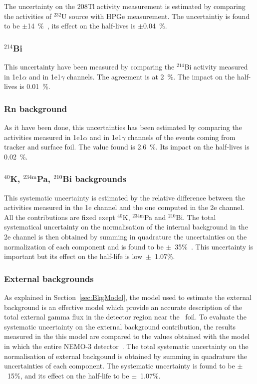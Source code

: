 \documentclass[main.tex]{subfiles}
\begin{document}
\NI The uncertainty on the $\text{208}$Tl activity measurement is estimated by comparing the activities of $^{\text{232}}$U source with HPGe measurement. The uncertaintiy is found to be $\pm$14~\%~\cite{PositionPaperSummer}, its effect on the half-lives is $\pm$0.04~\%. 
 
 
\subsubsection{$^{\text{214}}$Bi}


\NI This uncertainty have been measured by comparing the $^{\text{214}}$Bi activity measured in 1e1$\alpha$ and in 1e1$\gamma$ channels. The agreement is at 2~\%. The impact on the half-lives is 0.01~\%.


\subsubsection{Rn background}


\NI As it have been done, this uncertainties has been estimated by comparing the activities measured in 1e1$\alpha$ and in 1e1$\gamma$ channels of the events coming from tracker and surface foil. The value found is 2.6~\%. Its impact on the half-lives is 0.02~\%.


\subsubsection{$^{\text{40}}$K, $^{\text{234m}}$Pa, $^{\text{210}}$Bi backgrounds}


\NI This systematic uncertainty is estimated by the relative difference between the activities measured in the 1e channel and the one computed in the 2e channel. All the contributions are fixed exept $^{\text{40}}$K, $^{\text{234m}}$Pa and $^{\text{210}}$Bi. The total systematical uncertainty on the normalisation of the internal background in the 2e channel is then obtained by summing in quadrature the uncertainties on the normalization of each component and is found to be $\pm$~35\%~\cite{Arnold2016bed}. This uncertainty is important but its effect on the half-life is low~$\pm$~1.07\%. 


\subsubsection{External backgrounds}



\NI As explained in Section~\ref{sec:BkgModel}, the model used to estimate the external background is an effective model which provide an accurate description of the total external gamma flux in the detector region near the \Cd~foil. To evaluate the systematic uncertainty on the external background contribution, the results measured in the this model are compared to the values obtained with the model in which the entire NEMO-3 detector~\cite{NEMO3-BKG}. The total systematic uncertainty on the normalisation of external backgound is obtained by summing in quadrature the uncertainties of each component. The systematic uncertainty is found to be $\pm$~15\%, and its effect on the half-life to be $\pm$~1.07\%. 
\end{document}
